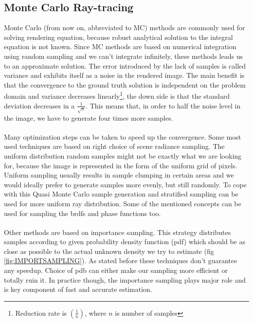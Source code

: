 \subsection{Monte Carlo Ray-tracing}
Monte Carlo (from now on, abbreviated to MC) methods are commonly used for solving rendering equation, because robust analytical solution to the integral equation is not known. Since MC methods are based on numerical integration using random sampling and we can't integrate infinitely, these methods leads us to an approximate solution. The error introduced by the lack of samples is called variance and exhibits itself as a noise in the rendered image. The main benefit is that the convergence to the ground truth solution is independent on the problem domain and variance decreases linearly\footnote{Reduction rate is $(\frac{1}{n})$, where $n$ is number of samples}, the down side is that the standard deviation decreases in a $\frac{1}{\sqrt{n}}$. This means that, in order to half the noise level in the image, we have to generate four times more samples.
\\
\\
Many optimization steps can be taken to speed up the convergence. Some most used techniques are based on right choice of scene radiance sampling. The uniform distribution random samples might not be exactly what we are looking for, because the image is represented in the form of the uniform grid of pixels. Uniform sampling usually results in sample clumping in certain areas and we would ideally prefer to generate samples more evenly, but still randomly. To cope with this Quasi Monte Carlo sample generation and stratified sampling can be used for more uniform ray distribution. Some of the mentioned concepts can be used for sampling the brdfs and phase functions too. 
\\
\\
Other methods are based on importance sampling. This strategy distributes samples according to given probability density function (pdf) which should be as close as possible to the actual unknown density we try to estimate (fig \ref{fig:IMPORTSAMPLING}). As stated before these techniques don't guarantee any speedup. Choice of pdb can either make our sampling more efficient or totally ruin it. In practice though, the importance sampling plays major role and is key component of fast and accurate estimation.


